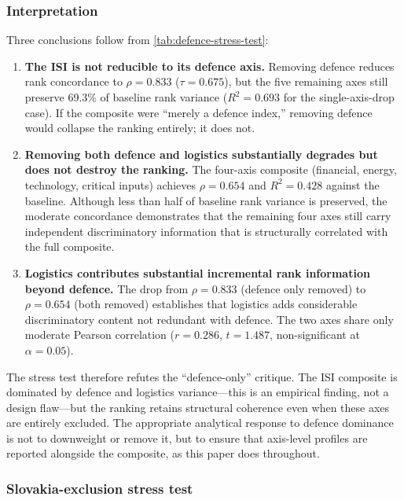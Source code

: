 \subsubsection{Interpretation}

Three conclusions follow from \cref{tab:defence-stress-test}:

\begin{enumerate}[leftmargin=2em]
  \item \textbf{The ISI is not reducible to its defence axis.}
    Removing defence reduces rank concordance to $\rho = 0.833$
    ($\tau = 0.675$), but the five remaining axes still preserve
    69.3\% of baseline rank variance ($R^2 = 0.693$ for the
    single-axis-drop case).  If the composite were ``merely a
    defence index,'' removing defence would collapse the ranking
    entirely; it does not.

  \item \textbf{Removing both defence and logistics substantially
    degrades but does not destroy the ranking.}  The four-axis
    composite (financial, energy, technology, critical inputs) achieves
    $\rho = 0.654$ and $R^2 = 0.428$ against the baseline.  Although
    less than half of baseline rank variance is preserved, the moderate
    concordance demonstrates that the remaining four axes still carry
    independent discriminatory information that is structurally
    correlated with the full composite.

  \item \textbf{Logistics contributes substantial incremental rank
    information beyond defence.}  The drop from $\rho = 0.833$
    (defence only removed) to $\rho = 0.654$ (both removed) establishes
    that logistics adds considerable discriminatory content not
    redundant with defence.  The two axes share only moderate Pearson
    correlation ($r = 0.286$, $t = 1.487$, non-significant at
    $\alpha = 0.05$).
\end{enumerate}

The stress test therefore refutes the ``defence-only'' critique.  The
ISI composite is dominated by defence and logistics variance---this
is an empirical finding, not a design flaw---but the ranking retains
structural coherence even when these axes are entirely excluded.  The
appropriate analytical response to defence dominance is not to
downweight or remove it, but to ensure that axis-level profiles are
reported alongside the composite, as this paper does throughout.

\subsubsection{Slovakia-exclusion stress test}

